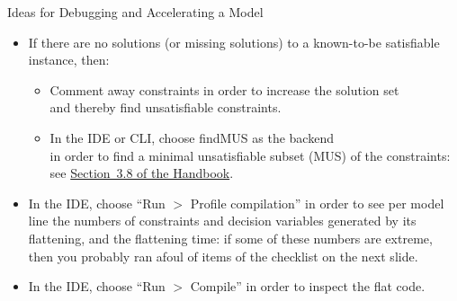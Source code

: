 \documentclass{cons-beamer}
\begin{document}
\begin{flashcardminizinc}
\begin{frame}{Ideas for Debugging and Accelerating a Model}
  \begin{itemize}
  \item If there are no solutions (or missing solutions) to a
    known-to-be satisfiable instance, then: \vfill
    \begin{itemize}
    \item Comment away constraints in order to increase the solution
      set \\ and thereby find unsatisfiable constraints. \vfill
    \item In the IDE or CLI, choose findMUS as the backend \\ in order
      to find a minimal unsatisfiable subset (MUS) of the constraints: \\
      see \href{https://www.minizinc.org/doc-latest/en/find_mus.html}{Section~3.8 of the \MiniZinc Handbook}.
    \end{itemize}\vfill
  \item In the IDE, choose ``Run $>$ Profile compilation'' in order to
    see per model line the numbers of constraints and decision
    variables generated by its flattening, and the flattening time: if
    some of these numbers are extreme, then you probably ran afoul of
    items of the checklist on the next slide. \vfill
  \item In the IDE, choose ``Run $>$ Compile'' in order to inspect the
    flat code.
  \end{itemize}
\end{frame}
\end{flashcardminizinc} 
\end{document}
